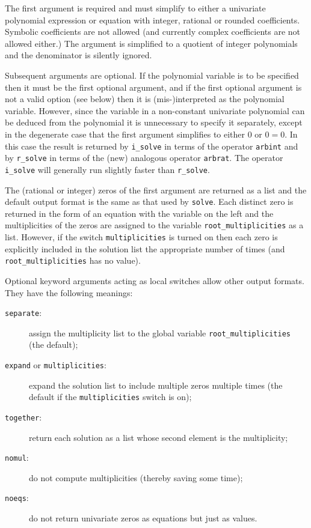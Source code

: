 The first argument is required and must simplify to either a
univariate polynomial expression or equation with integer, rational or
rounded coefficients.  Symbolic coefficients are not allowed (and
currently complex coefficients are not allowed either.)  The argument
is simplified to a quotient of integer polynomials and the denominator
is silently ignored.

Subsequent arguments are optional.  If the polynomial variable is to
be specified then it must be the first optional argument, and if the
first optional argument is not a valid option (see below) then it is
(mis-)interpreted as the polynomial variable.  However, since the
variable in a non-constant univariate polynomial can be deduced from
the polynomial it is unnecessary to specify it separately, except in
the degenerate case that the first argument simplifies to either 0 or
$0 = 0$.  In this case the result is returned by \verb|i_solve| in
terms of the operator \verb|arbint| and by \verb|r_solve| in terms of
the (new) analogous operator \verb|arbrat|.  The operator
\verb|i_solve| will generally run slightly faster than \verb|r_solve|.

The (rational or integer) zeros of the first argument are returned as
a list and the default output format is the same as that used by
\verb|solve|.  Each distinct zero is returned in the form of an
equation with the variable on the left and the multiplicities of the
zeros are assigned to the variable \verb|root_multiplicities| as a
list.  However, if the switch \verb|multiplicities| is turned on then
each zero is explicitly included in the solution list the appropriate
number of times (and \verb|root_multiplicities| has no value).

\begin{sloppypar}
Optional keyword arguments acting as local switches allow other output
formats.  They have the following meanings:
\begin{description}
\item[\verb|separate|:] assign the multiplicity list to the global
  variable \verb|root_multiplicities| (the default);
\item[\verb|expand| or \verb|multiplicities|:] expand the solution
  list to include multiple zeros multiple times (the default if the
  \verb|multiplicities| switch is on);
\item[\verb|together|:] return each solution as a list whose second
  element is the multiplicity;
\item[\verb|nomul|:] do not compute multiplicities (thereby saving
  some time);
\item[\verb|noeqs|:] do not return univariate zeros as equations but
  just as values.
\end{description}
\end{sloppypar}


